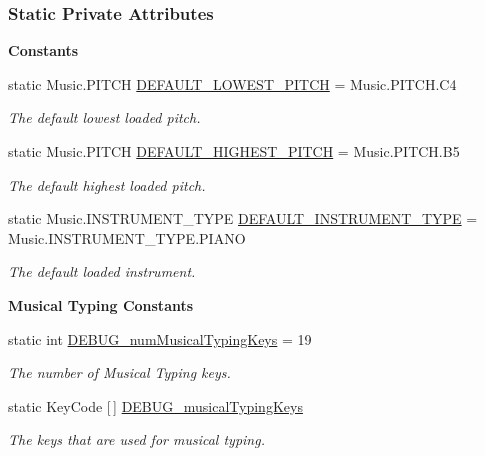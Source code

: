 \subsubsection*{Static Private Attributes}
\begin{Indent}\textbf{ Constants}\par
\begin{DoxyCompactItemize}
\item 
static Music.\+P\+I\+T\+CH \hyperlink{group___virtual_instrument_manager_ga064b6f85a7d2a4b2f552ba80c50f14db}{D\+E\+F\+A\+U\+L\+T\+\_\+\+L\+O\+W\+E\+S\+T\+\_\+\+P\+I\+T\+CH} = Music.\+P\+I\+T\+C\+H.\+C4
\begin{DoxyCompactList}\small\item\em The default lowest loaded pitch. \end{DoxyCompactList}\item 
static Music.\+P\+I\+T\+CH \hyperlink{group___virtual_instrument_manager_gafa0e722faa150594582d492e4c6c38c4}{D\+E\+F\+A\+U\+L\+T\+\_\+\+H\+I\+G\+H\+E\+S\+T\+\_\+\+P\+I\+T\+CH} = Music.\+P\+I\+T\+C\+H.\+B5
\begin{DoxyCompactList}\small\item\em The default highest loaded pitch. \end{DoxyCompactList}\item 
static Music.\+I\+N\+S\+T\+R\+U\+M\+E\+N\+T\+\_\+\+T\+Y\+PE \hyperlink{group___virtual_instrument_manager_ga92242f6a12951829414db205a5b3702c}{D\+E\+F\+A\+U\+L\+T\+\_\+\+I\+N\+S\+T\+R\+U\+M\+E\+N\+T\+\_\+\+T\+Y\+PE} = Music.\+I\+N\+S\+T\+R\+U\+M\+E\+N\+T\+\_\+\+T\+Y\+P\+E.\+P\+I\+A\+NO
\begin{DoxyCompactList}\small\item\em The default loaded instrument. \end{DoxyCompactList}\end{DoxyCompactItemize}
\end{Indent}
\begin{Indent}\textbf{ Musical Typing Constants}\par
\begin{DoxyCompactItemize}
\item 
static int \hyperlink{group___audio_testing_gac1164fc3a43ae37e49515da8c5072f50}{D\+E\+B\+U\+G\+\_\+num\+Musical\+Typing\+Keys} = 19
\begin{DoxyCompactList}\small\item\em The number of Musical Typing keys. \end{DoxyCompactList}\item 
static Key\+Code \mbox{[}$\,$\mbox{]} \hyperlink{group___audio_testing_ga6618f779b7c99fe994365d608ce563a2}{D\+E\+B\+U\+G\+\_\+musical\+Typing\+Keys}
\begin{DoxyCompactList}\small\item\em The keys that are used for musical typing. \end{DoxyCompactList}\end{DoxyCompactItemize}
\end{Indent}
